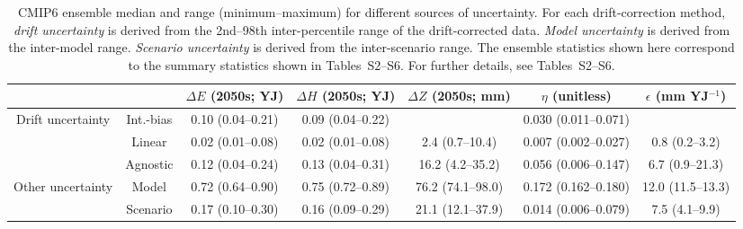 \begin{table*}[t]
\centering
\caption{CMIP6 ensemble median and range (minimum–maximum) for different sources of uncertainty. For each drift-correction method, \emph{drift uncertainty} is derived from the 2nd--98th inter-percentile range of the drift-corrected data. \emph{Model uncertainty} is derived from the inter-model range. \emph{Scenario uncertainty} is derived from the inter-scenario range. The ensemble statistics shown here correspond to the summary statistics shown in Tables~S2--S6. For further details, see Tables~S2--S6.}
\begin{tabular}{cc|c|c|c|c|c}
\toprule
 &  & $\Delta E$ (2050s; YJ) & $\Delta H$ (2050s; YJ) & $\Delta Z$ (2050s; mm) & $\eta$ (unitless) & $\epsilon$ (mm YJ$^{-1}$) \\
\midrule
\multirow[c]{3}{*}{Drift uncertainty} & Int.-bias & 0.10 (0.04–0.21) & 0.09 (0.04–0.22) &  & 0.030 (0.011–0.071) &  \\
 & Linear & 0.02 (0.01–0.08) & 0.02 (0.01–0.08) & 2.4 (0.7–10.4) & 0.007 (0.002–0.027) & 0.8 (0.2–3.2) \\
 & Agnostic & 0.12 (0.04–0.24) & 0.13 (0.04–0.31) & 16.2 (4.2–35.2) & 0.056 (0.006–0.147) & 6.7 (0.9–21.3) \\
\midrule
\multirow[c]{2}{*}{Other uncertainty} & Model & 0.72 (0.64–0.90) & 0.75 (0.72–0.89) & 76.2 (74.1–98.0) & 0.172 (0.162–0.180) & 12.0 (11.5–13.3) \\
 & Scenario & 0.17 (0.10–0.30) & 0.16 (0.09–0.29) & 21.1 (12.1–37.9) & 0.014 (0.006–0.079) & 7.5 (4.1–9.9) \\
\bottomrule
\end{tabular}
\end{table*}
